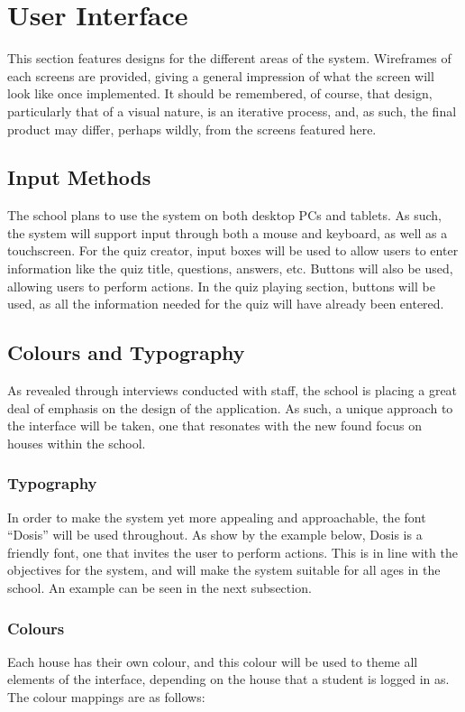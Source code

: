 \section{User Interface}
This section features designs for the different areas of the system. Wireframes of each screens are provided, giving a general impression of what the screen will look like once implemented. It should be remembered, of course, that design, particularly that of a visual nature, is an iterative process, and, as such, the final product may differ, perhaps wildly, from the screens featured here.

\subsection{Input Methods}
The school plans to use the system on both desktop PCs and tablets. As such, the system will support input through both a mouse and keyboard, as well as a touchscreen. For the quiz creator, input boxes will be used to allow users to enter information like the quiz title, questions, answers, etc. Buttons will also be used, allowing users to perform actions. In the quiz playing section, buttons will be used, as all the information needed for the quiz will have already been entered.

\subsection{Colours and Typography}
As revealed through interviews conducted with staff, the school is placing a great deal of emphasis on the design of the application. As such, a unique approach to the interface will be taken, one that resonates with the new found focus on houses within the school.

\subsubsection{Typography}
In order to make the system yet more appealing and approachable, the font ``Dosis'' will be used throughout. As show by the example below, Dosis is a friendly font, one that invites the user to perform actions. This is in line with the objectives for the system, and will make the system suitable for all ages in the school. An example can be seen in the next subsection.

\subsubsection{Colours}
Each house has their own colour, and this colour will be used to theme all elements of the interface, depending on the house that a student is logged in as. The colour mappings are as follows:

